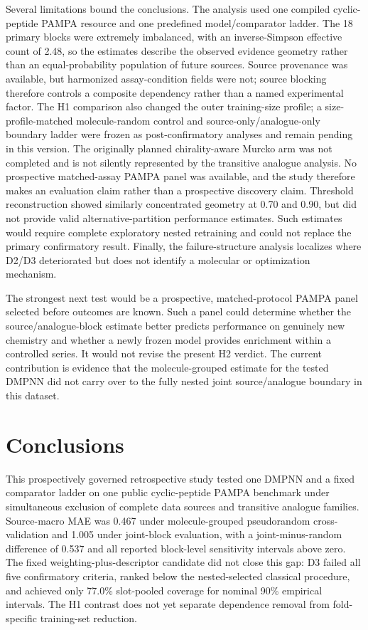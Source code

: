 \documentclass[referee,lineno,pdflatex,sn-vancouver-num]{sn-jnl}
\begin{document}
Several limitations bound the conclusions. The analysis used one compiled cyclic-peptide PAMPA resource and one predefined model/comparator ladder. The 18 primary blocks were extremely imbalanced, with an inverse-Simpson effective count of 2.48, so the estimates describe the observed evidence geometry rather than an equal-probability population of future sources. Source provenance was available, but harmonized assay-condition fields were not; source blocking therefore controls a composite dependency rather than a named experimental factor. The H1 comparison also changed the outer training-size profile; a size-profile-matched molecule-random control and source-only/analogue-only boundary ladder were frozen as post-confirmatory analyses and remain pending in this version. The originally planned chirality-aware Murcko arm was not completed and is not silently represented by the transitive analogue analysis. No prospective matched-assay PAMPA panel was available, and the study therefore makes an evaluation claim rather than a prospective discovery claim. Threshold reconstruction showed similarly concentrated geometry at 0.70 and 0.90, but did not provide valid alternative-partition performance estimates. Such estimates would require complete exploratory nested retraining and could not replace the primary confirmatory result. Finally, the failure-structure analysis localizes where D2/D3 deteriorated but does not identify a molecular or optimization mechanism.

The strongest next test would be a prospective, matched-protocol PAMPA panel selected before outcomes are known. Such a panel could determine whether the source/analogue-block estimate better predicts performance on genuinely new chemistry and whether a newly frozen model provides enrichment within a controlled series. It would not revise the present H2 verdict. The current contribution is evidence that the molecule-grouped estimate for the tested DMPNN did not carry over to the fully nested joint source/analogue boundary in this dataset.

\section{Conclusions}

This prospectively governed retrospective study tested one DMPNN and a fixed comparator ladder on one public cyclic-peptide PAMPA benchmark under simultaneous exclusion of complete data sources and transitive analogue families. Source-macro MAE was 0.467 under molecule-grouped pseudorandom cross-validation and 1.005 under joint-block evaluation, with a joint-minus-random difference of 0.537 and all reported block-level sensitivity intervals above zero. The fixed weighting-plus-descriptor candidate did not close this gap: D3 failed all five confirmatory criteria, ranked below the nested-selected classical procedure, and achieved only 77.0\% slot-pooled coverage for nominal 90\% empirical intervals. The H1 contrast does not yet separate dependence removal from fold-specific training-set reduction.
\end{document}
